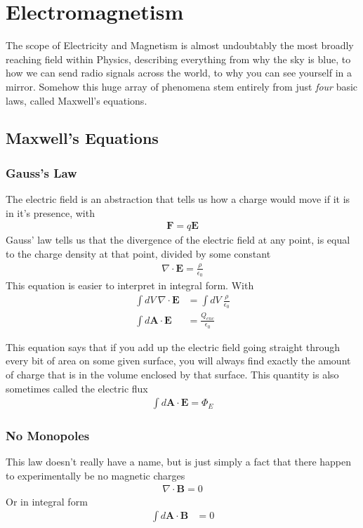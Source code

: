 


\chapter{Electromagnetism}

The scope of Electricity and Magnetism is almost undoubtably the most broadly reaching field within Physics, describing everything from   why the sky is blue, to how we can send radio signals across the world, to why you can see yourself in a mirror. Somehow this huge array of phenomena stem entirely from just \emph{four} basic laws, called Maxwell's equations.




\section{Maxwell's Equations}


\subsection{Gauss's Law}\label{gauss}
The electric field is an abstraction that tells us how a charge would move if it is in it's presence, with
\begin{align}
    \textbf{F} = q\textbf{E}
\end{align}
Gauss' law tells us that the divergence of the electric field at any point, is equal to the charge density at that point, divided by some constant
\begin{align}
    \nabla\cdot\textbf{E} = \frac{\rho}{\epsilon_0}
\end{align}
This equation is easier to interpret in integral form. With
\begin{align}
    \int dV~ \nabla\cdot\textbf{E} &= \int dV~\frac{\rho}{\epsilon_0}\\
    \int d\textbf{A}\cdot\textbf{E} &= \frac{Q_{enc}}{\epsilon_0}
\end{align}

This equation says that if you add up the electric field going straight through every bit of area on some given surface, you will always find exactly the amount of charge that is in the volume enclosed by that surface. This quantity is also sometimes called the electric flux
\begin{align}
    \int d\textbf{A}\cdot\textbf{E} = \Phi_E
\end{align}

\subsection{No Monopoles}
This law doesn't really have a name, but is just simply a fact that there happen to experimentally be no magnetic charges
\begin{align}
    \nabla\cdot\textbf{B} = 0
\end{align}
Or in integral form
\begin{align}
    \int d\textbf{A}\cdot\textbf{B} &= 0
\end{align}



